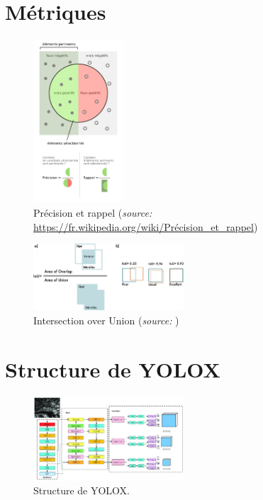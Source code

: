 \chapter{Métriques}

\begin{figure}[h]
    \label{precision_recall}
    \centering
    \includegraphics[width=0.3\textwidth]{./img/precision_recall.png}
    \caption{Précision et rappel (\textit{source:} \url{https://fr.wikipedia.org/wiki/Précision_et_rappel})}
\end{figure}

\begin{figure}[h]
    \label{iou}
    \centering
    \includegraphics[width=0.5\textwidth]{./img/iou.png}
    \caption{Intersection over Union (\textit{source:}
    \cite{Terven_Cordova-Esparza_Ramirez-Pedraza_Chavez-Urbiola_2023})}
\end{figure}

\pagebreak

\chapter{Structure de YOLOX}


\begin{figure}[h]
    \label{yolox_structure}
    \centering
    \includegraphics[width=0.5\textwidth]{./img/The-network-structure-of-YOLOX.png}
    \caption{Structure de YOLOX.}
\end{figure}


